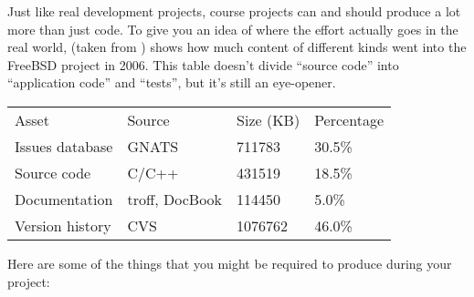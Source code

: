 \documentclass{report}
\begin{document}
Just like real development projects, course projects can and should
produce a lot more than just code.  To give you an idea of where the
effort actually goes in the real world, 
(taken from \cite{b:spinellis-effort}) shows how much content of
different kinds went into the FreeBSD project in 2006.  This table
doesn't divide ``source code'' into ``application code'' and
``tests'', but it's still an eye-opener.

\begin{table}
  \begin{tabular}{llll}

  Asset
  &
  Source
  &
  Size (KB)
  &
  Percentage
  \\

  Issues database
  &
  GNATS
  &
  711783
  &
  30.5\%
  \\

  Source code
  &
  C/C++
  &
  431519
  &
  18.5\%
  \\

  Documentation
  &
  troff, DocBook
  &
  114450
  &
  5.0\%
  \\

  Version history
  &
  CVS
  &
  1076762
  &
  46.0\%
  \\

  \end{tabular}


\end{table}

Here are some of the things that you might be required to produce
during your project:
\end{document}
